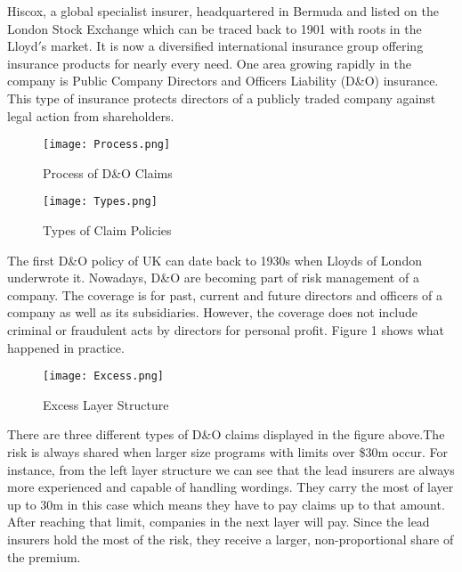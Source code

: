 Hiscox, a global specialist insurer, headquartered in Bermuda and listed on the London Stock Exchange which can be traced back to 1901 with roots in the Lloyd$'$s market. It is now a diversified international insurance group offering insurance products for nearly every need. One area growing rapidly in the company is Public Company Directors and Officers Liability (D\&O) insurance. This type of insurance protects directors of a publicly traded company against legal action from shareholders. \\
\begin{figure}[h]
  \centering
  \texttt{[image: Process.png]}
  \caption{Process of D\&O Claims}
\end{figure}
\setlength{\textfloatsep}{5pt}
\clearpage
\begin{figure}[h]
  \centering
  \texttt{[image: Types.png]}
  \caption{Types of Claim Policies}
\end{figure}
The first D\&O policy of UK can date back to 1930s when Lloyds of London underwrote it. Nowadays, D\&O are becoming part of risk management of a company. The coverage is for past, current and future directors and officers of a company as well as its subsidiaries. However, the coverage does not include criminal or fraudulent acts by directors for personal profit. Figure 1 shows what happened in practice.\\
\setlength{\textfloatsep}{5pt}
\begin{figure}[h]
  \centering
  \texttt{[image: Excess.png]}
  \caption{Excess Layer Structure}
\end{figure}
\setlength{\textfloatsep}{5pt}
\indent There are three different types of D\&O claims displayed in the figure above.The risk is always shared when larger size programs with limits over \$30m occur. For instance, from the left layer structure we can see that the lead insurers are always  more experienced and capable of handling wordings. They carry the most of layer up to 30m in this case which means they have to pay claims up to that amount. After reaching that limit, companies in the next layer will pay. Since the lead insurers hold the most of the risk, they receive a larger, non-proportional share of the premium. \\
